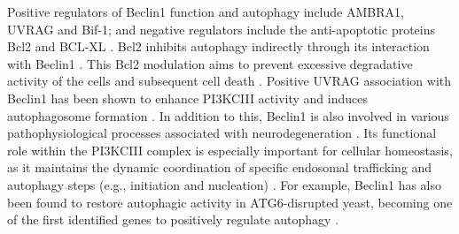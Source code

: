 Positive regulators of Beclin1 function and autophagy include AMBRA1, UVRAG and Bif-1; and negative regulators include the anti-apoptotic proteins Bcl2 and BCL-XL \citep{Pattingre2005,Sinha2008}. Bcl2 inhibits autophagy indirectly through its interaction with Beclin1 \citep{Pattingre2005}. This Bcl2 modulation aims to prevent excessive degradative activity of the cells and subsequent cell death \citep{Pattingre2005}. Positive UVRAG association with Beclin1 has been shown to enhance PI3KCIII activity and induces autophagosome formation \citep{Liang2006}. In addition to this, Beclin1 is also involved in various pathophysiological processes associated with neurodegeneration \citep{He2010}. Its functional role within the PI3KCIII complex is especially important for cellular homeostasis, as it maintains the dynamic coordination of specific endosomal trafficking and autophagy steps (e.g., initiation and nucleation) \citep{Liang2008,Matsunaga2009,Russell2013}. For example, Beclin1 has also been found to restore autophagic activity in ATG6-disrupted yeast, becoming one of the first identified genes to positively regulate autophagy \citep{Liang1999}.
